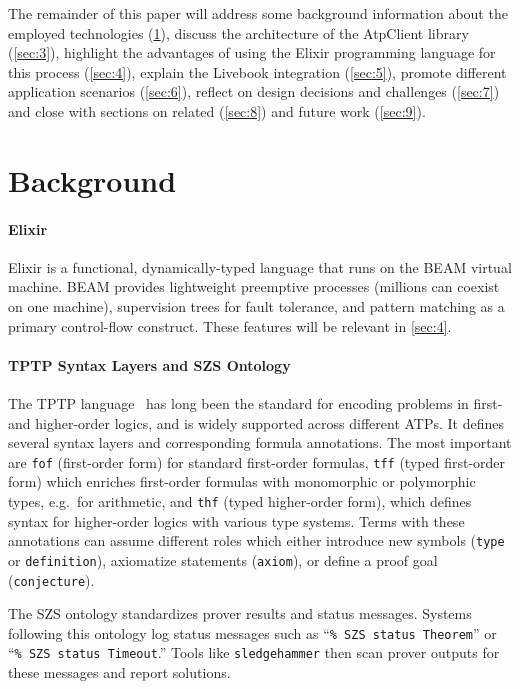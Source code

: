 \documentclass[]{ceurart}
\begin{document}
The remainder of this paper will address some background information about the employed technologies (\cref{sec:2}), discuss the architecture of the AtpClient library (\cref{sec:3}), highlight the advantages of using the Elixir programming language for this process (\cref{sec:4}), explain the Livebook integration (\cref{sec:5}), promote different application scenarios (\cref{sec:6}), reflect on design decisions and challenges (\cref{sec:7}) and close with sections on related (\cref{sec:8}) and future work  (\cref{sec:9}).

\section{Background}\label{sec:2}

\paragraph{Elixir}

Elixir is a functional, dynamically-typed language that runs on the BEAM virtual machine. BEAM provides lightweight preemptive processes (millions can coexist on one machine), supervision trees for fault tolerance, and pattern matching as a primary control-flow construct. These features will be relevant in \cref{sec:4}.

\paragraph{TPTP Syntax Layers and SZS Ontology}

The TPTP language~\cite{sutcliffe2024tptpworld} has long been the standard for encoding problems in first- and higher-order logics, and is widely supported across different ATPs. It defines several syntax layers and corresponding formula annotations. The most important are \texttt{fof} (first-order form) for standard first-order formulas, \texttt{tff} (typed first-order form) which enriches first-order formulas with monomorphic or polymorphic types, e.g.\ for arithmetic, and \texttt{thf} (typed higher-order form), which defines syntax for higher-order logics with various type systems. Terms with these annotations can assume different roles which either introduce new symbols (\texttt{type} or \texttt{definition}), axiomatize statements (\texttt{axiom}), or define a proof goal (\texttt{conjecture}).

The SZS ontology standardizes prover results and status messages. Systems following this ontology log status messages such as ``\texttt{\% SZS status Theorem}'' or ``\texttt{\% SZS status Timeout}.'' Tools like \texttt{sledgehammer} then scan prover outputs for these messages and report solutions.
\end{document}
